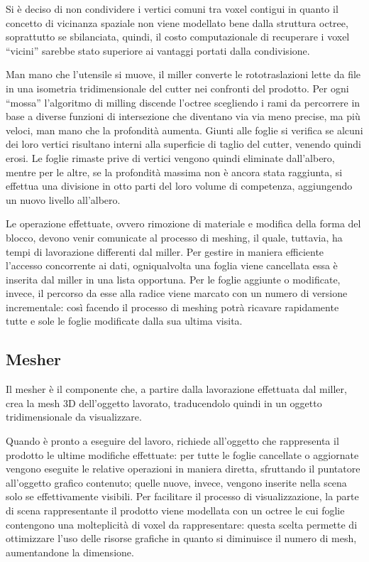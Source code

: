\documentclass[11pt,a4paper,twoside,openright,titlepage,fleqn,%
               headinclude,,footinclude,BCOR5mm,%
               numbers=noenddot,cleardoublepage=empty,%
               tablecaptionabove]{scrreprt}
\begin{document}
Si è deciso di non condividere i vertici comuni tra voxel contigui in quanto il concetto di vicinanza spaziale non viene modellato bene dalla struttura octree, soprattutto se sbilanciata, quindi, il costo computazionale di recuperare i voxel ``vicini'' sarebbe stato superiore ai vantaggi portati dalla condivisione.

Man mano che l'utensile si muove, il miller converte le rototraslazioni lette da file in una isometria tridimensionale del cutter nei confronti del prodotto. Per ogni ``mossa'' l’algoritmo di milling discende l’octree scegliendo i rami da percorrere in base a diverse funzioni di intersezione che diventano via via meno precise, ma più veloci, man mano che la profondità aumenta. Giunti alle foglie si verifica se alcuni dei loro vertici risultano interni alla superficie di taglio del cutter, venendo quindi erosi. Le foglie rimaste prive di vertici vengono quindi eliminate dall’albero, mentre per le altre, se la profondità massima non è ancora stata raggiunta, si effettua una divisione in otto parti del loro volume di competenza, aggiungendo un nuovo livello all’albero.

Le operazione effettuate, ovvero rimozione di materiale e modifica della forma del blocco, devono venir comunicate al processo di meshing, il quale, tuttavia, ha tempi di lavorazione differenti dal miller. Per gestire in maniera efficiente l'accesso concorrente ai dati, ogniqualvolta una foglia viene cancellata essa è inserita dal miller in una lista opportuna. Per le foglie aggiunte o modificate, invece, il percorso da esse alla radice viene marcato con un numero di versione incrementale: così facendo il processo di meshing potrà ricavare rapidamente tutte e sole le foglie modificate dalla sua ultima visita.

\subsection{Mesher}
Il mesher è il componente che, a partire dalla lavorazione effettuata dal miller, crea la mesh 3D dell'oggetto lavorato, traducendolo quindi in un oggetto tridimensionale da visualizzare.

Quando è pronto a eseguire del lavoro, richiede all’oggetto che rappresenta il prodotto le ultime modifiche effettuate: per tutte le foglie cancellate o aggiornate vengono eseguite le relative operazioni in maniera diretta, sfruttando il puntatore all’oggetto grafico contenuto;  quelle nuove, invece, vengono inserite nella scena solo se effettivamente visibili. Per facilitare il processo di visualizzazione, la parte di scena rappresentante il prodotto viene modellata con un octree le cui foglie contengono una molteplicità di voxel da rappresentare: questa scelta permette di ottimizzare l’uso delle risorse grafiche in quanto si diminuisce il numero di mesh, aumentandone la dimensione.
\end{document}
